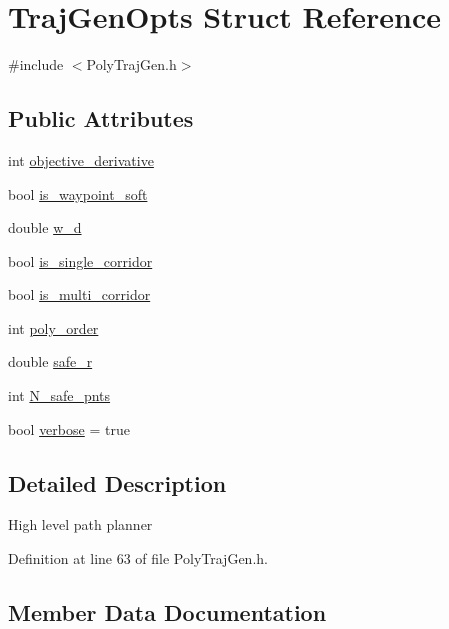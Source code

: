 \hypertarget{struct_traj_gen_opts}{}\section{Traj\+Gen\+Opts Struct Reference}
\label{struct_traj_gen_opts}


{\ttfamily \#include $<$Poly\+Traj\+Gen.\+h$>$}

\subsection*{Public Attributes}
\begin{DoxyCompactItemize}
\item 
int \hyperlink{struct_traj_gen_opts_ad8937f645e1154dc52978bd6592ce836}{objective\+\_\+derivative}
\item 
bool \hyperlink{struct_traj_gen_opts_a5f27ab3f06720accfeaf88d44da2c5d6}{is\+\_\+waypoint\+\_\+soft}
\item 
double \hyperlink{struct_traj_gen_opts_a7424679070ea7264f7c8b6df5461bdb9}{w\+\_\+d}
\item 
bool \hyperlink{struct_traj_gen_opts_ad4725655d38467206ed000eacfd6c54a}{is\+\_\+single\+\_\+corridor}
\item 
bool \hyperlink{struct_traj_gen_opts_a7ba33a57327fba375f137f1f0104c1ea}{is\+\_\+multi\+\_\+corridor}
\item 
int \hyperlink{struct_traj_gen_opts_a538985230ef4a8cd7763c91d11bebbaf}{poly\+\_\+order}
\item 
double \hyperlink{struct_traj_gen_opts_aba857cb0ae86cbac99ba5adf9320c66d}{safe\+\_\+r}
\item 
int \hyperlink{struct_traj_gen_opts_a216fe9912362cc5e876f945112811c35}{N\+\_\+safe\+\_\+pnts}
\item 
bool \hyperlink{struct_traj_gen_opts_ab4888a8e142d514867bb3dfacb84e3d2}{verbose} = true
\end{DoxyCompactItemize}


\subsection{Detailed Description}
High level path planner 

Definition at line 63 of file Poly\+Traj\+Gen.\+h.



\subsection{Member Data Documentation}
